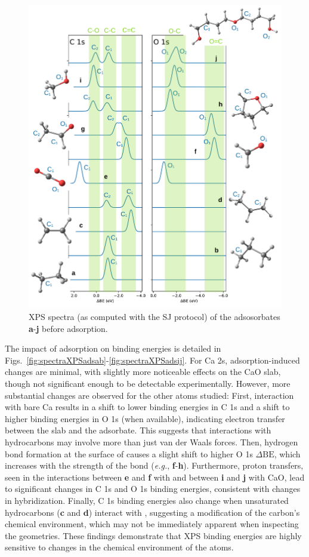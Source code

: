 \documentclass[journal=jpccck,manuscript=article]{achemso}
\def\dbe{\ensuremath{\Delta\text{BE}}}
\begin{document}
\begin{figure}[!h]
	\includegraphics[width=\linewidth]{Figure11}
	\caption{XPS spectra (as computed with the SJ protocol) of the adsosorbates \textbf{a}-\textbf{j} before adsorption.}
	\label{fig:adsorbare}
\end{figure}

\clearpage

The impact of adsorption on binding energies is detailed in Figs.~\ref{fig:spectraXPSadsab}-\ref{fig:spectraXPSadsij}. For Ca 2s, adsorption-induced changes are minimal, with slightly more noticeable effects on the CaO slab, though not significant enough to be detectable experimentally. However, more substantial changes are observed for the other atoms studied: 
First, interaction with bare Ca results in a shift to lower binding energies in C 1s and a shift to higher binding energies in O 1s (when available), indicating electron transfer between the slab and the adsorbate. This suggests that interactions with hydrocarbons may involve more than just van der Waals forces. Then, hydrogen bond formation at the surface of  causes a slight shift to higher O 1s \dbe{}, which increases with the strength of the bond (\textit{e.g.}, \textbf{f}-\textbf{h}).
Furthermore, proton transfers, seen in the interactions between \textbf{e} and \textbf{f} with  and between \textbf{i} and \textbf{j} with CaO, lead to significant changes in C 1s and O 1s binding energies, consistent with changes in hybridization. Finally, C 1s binding energies also change when unsaturated hydrocarbons (\textbf{c} and \textbf{d}) interact with , suggesting a modification of the carbon's chemical environment, which may not be immediately apparent when inspecting the geometries.
These findings demonstrate that XPS binding energies are highly sensitive to changes in the chemical environment of the atoms.
\end{document}
